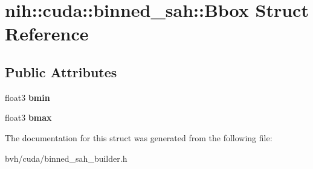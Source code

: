\hypertarget{structnih_1_1cuda_1_1binned__sah_1_1_bbox}{
\section{nih\-:\-:cuda\-:\-:binned\-\_\-sah\-:\-:\-Bbox \-Struct \-Reference}
\label{structnih_1_1cuda_1_1binned__sah_1_1_bbox}
}
\subsection*{\-Public \-Attributes}
\begin{DoxyCompactItemize}
\item 
\hypertarget{structnih_1_1cuda_1_1binned__sah_1_1_bbox_abc6191921ae103f2af41df5f1d275f7f}{
float3 {\bfseries bmin}}
\label{structnih_1_1cuda_1_1binned__sah_1_1_bbox_abc6191921ae103f2af41df5f1d275f7f}

\item 
\hypertarget{structnih_1_1cuda_1_1binned__sah_1_1_bbox_a61cad126c5a007ba5c1f17ea525dee10}{
float3 {\bfseries bmax}}
\label{structnih_1_1cuda_1_1binned__sah_1_1_bbox_a61cad126c5a007ba5c1f17ea525dee10}

\end{DoxyCompactItemize}


\-The documentation for this struct was generated from the following file\-:\begin{DoxyCompactItemize}
\item 
bvh/cuda/binned\-\_\-sah\-\_\-builder.\-h\end{DoxyCompactItemize}
